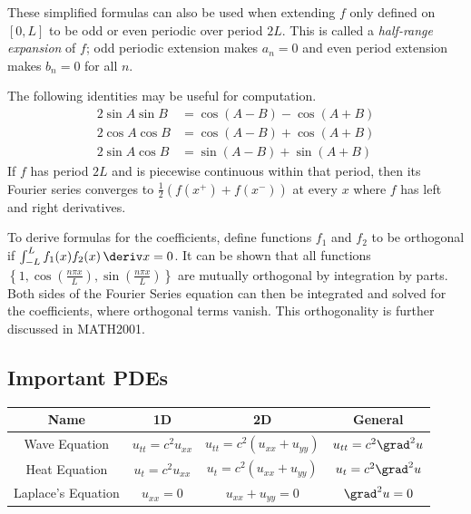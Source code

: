 \documentclass[10pt, a4paper]{article}
\begin{document}
\begin{landscape}
\begin{multicols}{2}
    These simplified formulas can also be used when extending \(f\) only defined on \([0, L]\) to be
    odd or even periodic over period \(2L\). This is called a \emph{half-range expansion} of \(f\);
    odd periodic extension makes \(a_n = 0\) and even period extension makes \(b_n = 0\) for all \(n\).
    
    The following identities may be useful for computation.
    \begin{align*}
        2 \sin A \sin B &= \cos(A - B) - \cos(A + B) \\
        2 \cos A \cos B &= \cos(A - B) + \cos(A + B) \\
        2 \sin A \cos B &= \sin(A - B) + \sin(A + B)
    \end{align*}
    If \(f\) has period \(2L\) and is piecewise continuous within that period, then its Fourier series converges
    to \(\frac{1}{2}(f(x^{+}) + f(x^{-}))\) at every \(x\) where \(f\) has left and right derivatives.

    To derive formulas for the coefficients, define functions \(f_1\) and \(f_2\) to be orthogonal
    if \(\int_{-L}^{L} f_1(x) f_2(x) \,\deriv x = 0\). It can be shown that all functions
    \(\left\{1, \cos\left(\frac{n \pi x}{L}\right), \sin\left(\frac{n \pi x}{L}\right)\right\}\)
    are mutually orthogonal by integration by parts.
    Both sides of the Fourier Series equation can then be integrated and solved for
    the coefficients, where orthogonal terms vanish. This orthogonality is further discussed in MATH2001.

\end{multicols}

\pagebreak

\begin{multicols*}{2}

    \section{Important PDEs}

    {
    \everymath{\displaystyle}
    \begin{center}
    \begin{tabular}{cccc}
        \toprule
        Name & 1D & 2D & General \\
        \midrule
        Wave Equation & \(u_{tt} = c^2 u_{xx}\) & \(u_{tt} = c^2 (u_{xx} + u_{yy})\) & \(u_{tt} = c^2 \grad^2 u\) \\
        Heat Equation & \(u_t = c^2 u_{xx}\) & \(u_{t} = c^2 (u_{xx} + u_{yy})\) & \(u_{t} = c^2 \grad^2 u\) \\
        Laplace's Equation & \(u_{xx} = 0\) & \(u_{xx} + u_{yy} = 0\) & \(\grad^2 u = 0\) \\
        \bottomrule
    \end{tabular}
    \end{center}
    }


\end{multicols*}
\end{landscape}
\end{document}
